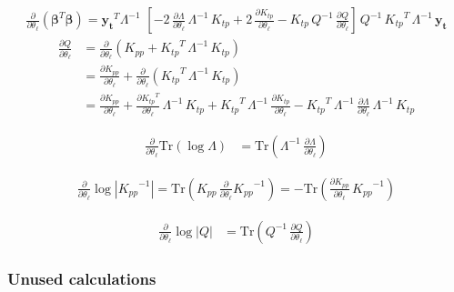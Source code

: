 \documentclass[11pt,a4paper]{article}
\newcommand{\abs}[1]{\left| #1 \right|}
\newcommand{\tr}{\text{Tr}}
\numberwithin{equation}{section}
\begin{document}
\begin{align}
\frac{\partial }{\partial \theta_\ell}\left({\bm \beta}^T{\bm \beta}\right) = \mathbf{y_t}^T\Lambda^{-1}\,\,\left[-2\,\frac{\partial \Lambda}{\partial \theta_\ell}\,\Lambda^{-1}\,K_{tp}
   +2\,\frac{\partial K_{tp}}{\partial \theta_\ell}
   -K_{tp}\,Q^{-1}\,\frac{\partial Q}{\partial \theta_\ell}
   \right]\,Q^{-1}\,{K_{tp}}^T\,\Lambda^{-1}\,\mathbf{y_t} \label{EQ:app_dbeta}
\end{align}
\begin{align}
\frac{\partial Q}{\partial \theta_\ell}
  &= \frac{\partial}{\partial \theta_\ell} \left(K_{pp} + {K_{tp}}^T\,\Lambda^{-1}\,K_{tp}\right) \\
  &= \frac{\partial K_{pp}}{\partial \theta_\ell} + \frac{\partial}{\partial \theta_\ell}\left({K_{tp}}^T\,\Lambda^{-1}\,K_{tp}\right) \\
  &= \frac{\partial K_{pp}}{\partial \theta_\ell} + \frac{\partial {K_{tp}}^T}{\partial \theta_\ell}\,\Lambda^{-1}\,K_{tp} + {K_{tp}}^T\,\Lambda^{-1}\,\frac{\partial K_{tp}}{\partial \theta_\ell} - {K_{tp}}^T\,\Lambda^{-1}\,\frac{\partial \Lambda}{\partial \theta_\ell}\,\Lambda^{-1}\,K_{tp}
\end{align}


\begin{align}
\frac{\partial }{\partial \theta_\ell}\tr\left(\log \Lambda\right)
  &= \tr\left(\Lambda^{-1}\,\frac{\partial \Lambda}{\partial \theta_\ell}\right)
\end{align}

\begin{align}
\frac{\partial }{\partial \theta_\ell} \log \abs{{K_{pp}}^{-1}}
  = \tr\left(K_{pp}\,\frac{\partial }{\partial \theta_\ell}{K_{pp}}^{-1}\right)
  = -\tr\left(\frac{\partial K_{pp}}{\partial \theta_\ell}\,{K_{pp}}^{-1}\right)
\end{align}

\begin{align}
\frac{\partial }{\partial \theta_\ell} \log \abs{Q}
  &= \tr\left(Q^{-1}\,\frac{\partial Q}{\partial \theta_\ell}\right)
\end{align}

\subsubsection{Unused calculations}
\end{document}
